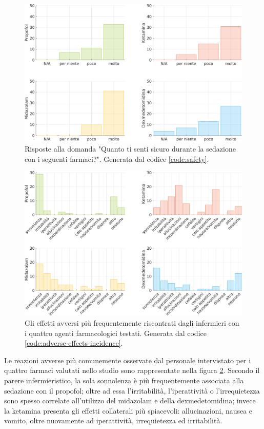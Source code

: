 \vfill

\newpage

\begin{figure}[!h]
    \centering
    \includegraphics[width=1\textwidth]{Figure/sicurezza-istogrammi.png}
    \caption{Risposte alla domanda "Quanto ti senti sicuro durante la sedazione con i seguenti farmaci?". Generata dal codice \ref{code:safety}.}
    \label{fig:sicurezza1}
\end{figure}


\begin{figure}[!h]
    \centering
    \includegraphics[width=1\textwidth]{Figure/effetti-avversi.png}
    \caption{Gli effetti avversi più frequentemente riscontrati dagli infermieri con i quattro agenti farmacologici testati. Generata dal codice \ref{code:adverse-effects-incidence}.}
    \label{fig:sicurezza}
\end{figure}

\newpage
Le reazioni avverse più comunemente osservate dal personale intervistato per i quattro farmaci valutati nello studio sono rappresentate nella figura \ref{fig:sicurezza}. Secondo il parere infermieristico, la sola sonnolenza è più frequentemente associata alla sedazione con il propofol; oltre ad essa l'irritabilità, l'iperattività o l'irrequietezza sono spesso correlate all'utilizzo del midazolam e della dexmedetomidina; invece la ketamina presenta gli effetti collaterali più spiacevoli: allucinazioni, nausea e vomito, oltre nuovamente ad iperattività, irrequietezza ed irritabilità.

